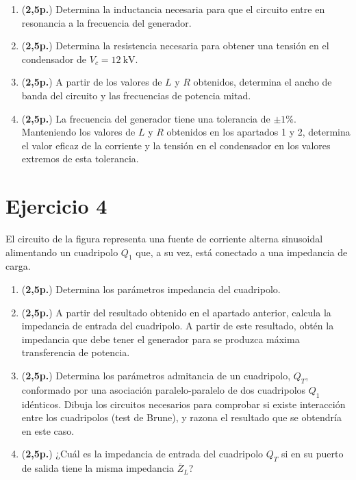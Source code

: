 \documentclass[12pt]{article}
\begin{document}
\begin{enumerate}

\item  (\textbf{2,5p.}) Determina la inductancia necesaria para que el circuito entre en resonancia a la frecuencia del generador.

\item  (\textbf{2,5p.}) Determina la resistencia necesaria para obtener una tensión en el condensador de $V_c = \SI{12}{\kilo\volt}$.
  
\item  (\textbf{2,5p.}) A partir de los valores de $L$ y $R$ obtenidos, determina el ancho de banda del circuito y las frecuencias de potencia mitad.

\item  (\textbf{2,5p.}) La frecuencia del generador tiene una tolerancia de $\pm1\%$. Manteniendo los valores de $L$ y $R$ obtenidos en los apartados 1 y 2, determina el valor eficaz de la corriente y la tensión en el condensador en los valores extremos de esta tolerancia.
  
\end{enumerate}

\section*{Ejercicio 4}

El circuito de la figura representa una fuente de corriente alterna sinusoidal alimentando un cuadripolo $Q_1$ que, a su vez, está conectado a una impedancia de carga. 
\begin{enumerate}
\item (\textbf{2,5p.}) Determina los parámetros impedancia del cuadripolo.
\item (\textbf{2,5p.}) A partir del resultado obtenido en el apartado anterior, calcula la impedancia de entrada del cuadripolo. A partir de este resultado, obtén la impedancia que debe tener el generador para se produzca máxima transferencia de potencia.
\item (\textbf{2,5p.}) Determina los parámetros admitancia de un cuadripolo, $Q_T$, conformado por una asociación paralelo-paralelo de dos cuadripolos $Q_1$ idénticos. Dibuja los circuitos necesarios para comprobar si existe interacción entre los cuadripolos (test de Brune), y razona el resultado que se obtendría en este caso. 
\item (\textbf{2,5p.}) ¿Cuál es la impedancia de entrada del cuadripolo $Q_T$ si en su puerto de salida tiene la misma impedancia $\overline{Z}_L$?
\end{enumerate}
\end{document}
